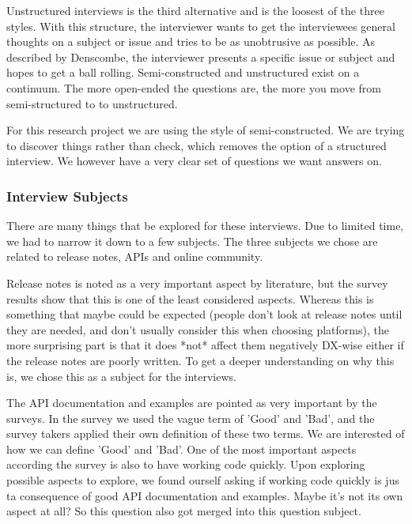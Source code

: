 \documentclass[11pt]{article}
\begin{document}
\begin{multicols}{2}
{    Unstructured interviews is the third alternative and is the loosest of the three styles.
    With this structure, the interviewer wants to get the interviewees general thoughts
    on a subject or issue and tries to be as unobtrusive as possible. As described by Denscombe,
    the interviewer presents a specific issue or subject and hopes to get a ball rolling.
    Semi-constructed and unstructured exist on a continuum. The more open-ended the questions
    are, the more you move from semi-structured to to unstructured.

    For this research project we are using the style of semi-constructed.
    We are trying to discover things rather than check, which removes the option
    of a structured interview. We however have a very clear set of questions
    we want answers on.

    \subsubsection{Interview Subjects}
    There are many things that be explored for these interviews. Due to limited
    time, we had to narrow it down to a few subjects. The three subjects
    we chose are related to release notes, APIs and online community.

    Release notes is noted as a very important aspect by literature, but
    the survey results show that this is one of the least considered aspects.
    Whereas this is something that maybe could be expected (people don't look
    at release notes until they are needed, and don't usually consider this
    when choosing platforms), the more surprising part is that it does *not*
    affect them negatively DX-wise either if the release notes are poorly written.
    To get a deeper understanding on why this is, we chose this as a subject
    for the interviews.

    The API documentation and examples are pointed as very important by the
    surveys. In the survey we used the vague term of 'Good' and 'Bad', and
    the survey takers applied their own definition of these two terms. We
    are interested of how we can define 'Good' and 'Bad'. One of the most important
    aspects according the survey is also to have working code quickly. Upon exploring
    possible aspects to explore, we found ourself asking if working code quickly
    is jus ta consequence of good API documentation and examples. Maybe it's not
    its own aspect at all? So this question also got merged into this question subject.

}
\end{multicols}
\end{document}
